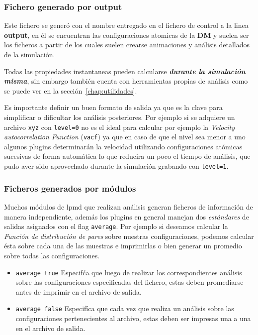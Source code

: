 \subsubsection{Fichero generado por output}
Este fichero se gener\'o con el nombre entregado en el fichero de control a la linea \textbf{output}, en \'el se encuentran las configuraciones atomicas de la \textbf{DM} y suelen ser los ficheros a partir de los cuales suelen crearse animaciones y an\'alisis detallados de la simulaci\'on.

Todas las propiedades instantaneas pueden calcularse \textit{\textbf{durante la simulaci\'on misma}}, sin embargo {\lpmd} tambi\'en cuenta con herramientas propias de an\'alisis como se puede ver en la secci\'on~\ref{chap:utilidades}.

Es importante definir un buen formato de salida ya que es la clave para simplificar o dificultar los an\'alisis posteriores. Por ejemplo si se adquiere un archivo \verb|xyz| con \verb|level=0| no es el ideal para calcular por ejemplo la \textit{Velocity autocorrelation Function} (\verb|vacf|) ya que en caso de que el nivel sea menor a uno algunos plugins determinar\'an la velocidad utilizando configuraciones at\'omicas sucesivas de forma autom\'atica lo que reducira un poco el tiempo de an\'alisis, que pudo aver sido aprovechado durante la simulaci\'on grabando con \verb|level=1|.

\subsubsection{Ficheros generados por m\'odulos}
Muchos m\'odulos de lpmd que realizan an\'alisis generan ficheros de informaci\'on de manera independiente, además los plugins en general manejan dos \textit{est\'andares} de salidas asignados con el flag \verb|average|. Por ejemplo si deseamos calcular la \textit{Funci\'on de distribuci\'on de pares} sobre nuestras configuraciones, podemos calcular \'esta sobre cada una de las muestras e imprimirlas o bien generar un promedio sobre todas las configuraciones.

\begin{itemize}
\item \verb|average true|
Especif\'ca que luego de realizar los correspondientes an\'alisis sobre las configuraciones especificadas del fichero, estas deben promediarse antes de imprimir en el archivo de salida.
\item \verb|average false|
Especif\'ica que cada vez que realiza un an\'alisis sobre las configuraciones pertenecientes al archivo, estas deben ser impresas una a una en el archivo de salida. 
\end{itemize}
